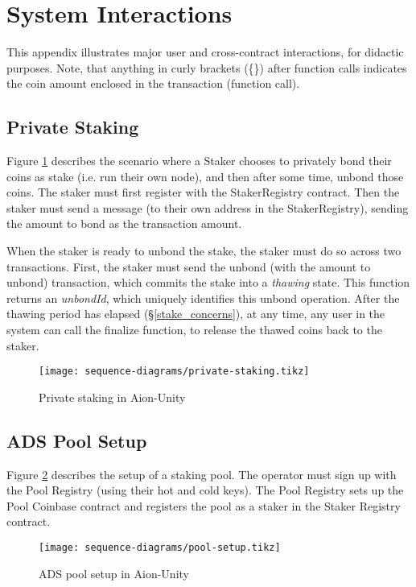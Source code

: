 \section{System Interactions}

This appendix illustrates major user and cross-contract interactions, for didactic purposes. Note, that anything in curly brackets (\{\}) after function calls indicates the coin amount enclosed in the transaction (function call).

\label{appendix:sequence_diagrams}

\subsection{Private Staking}
Figure \ref{fig:priv_staking} describes the scenario where a Staker chooses to privately bond their coins as stake (i.e. run their own node), and then after some time, unbond those coins. The staker must first register with the StakerRegistry contract. Then the staker must send a  message (to their own address in the StakerRegistry), sending the amount to bond as the transaction amount. 

When the staker is ready to unbond the stake, the staker must do so across two transactions. First, the staker must send the unbond (with the amount to unbond) transaction, which commits the stake into a \textit{thawing} state. This function returns an \textit{unbondId}, which uniquely identifies this unbond operation. After the thawing period has elapsed (\S\ref{stake_concerns}), at any time, any user in the system can call the finalize function, to release the thawed coins back to the staker. 

\begin{figure}[ht]
\centering
\texttt{[image: sequence-diagrams/private-staking.tikz]}
\caption{Private staking in Aion-Unity}
\label{fig:priv_staking}
\end{figure}
\clearpage

\subsection{ADS Pool Setup}
Figure \ref{fig:pool_setup} describes the setup of a staking pool. The operator must sign up with the Pool Registry (using their hot and cold keys). The Pool Registry sets up the Pool Coinbase contract and registers the pool as a staker in the Staker Registry contract. 

\begin{figure}[ht]
\centering
\texttt{[image: sequence-diagrams/pool-setup.tikz]}
\caption{ADS pool setup in Aion-Unity}
\label{fig:pool_setup}
\end{figure}
\clearpage


